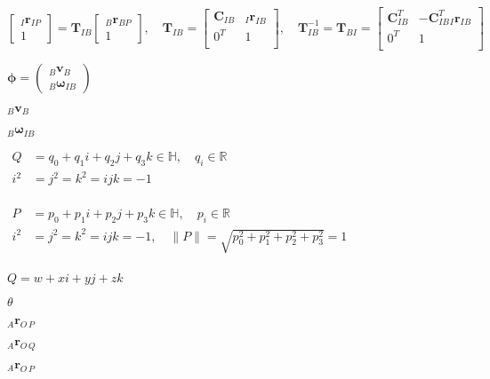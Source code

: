 \documentclass{article}
\begin{document}
$\boxed{\begin{bmatrix}{}_I\mathbf{r}_{I\!P} \\ 1 \end{bmatrix} = \mathbf{T}_{I\!B} \begin{bmatrix}{}_B\mathbf{r}_{B\!P}\\ 1 \end{bmatrix}, \quad \mathbf{T}_{I\!B} = \begin{bmatrix} \mathbf{C}_{I\!B} & {}_I\mathbf{r}_{I\!B} \\ 0^T & 1 \\ \end{bmatrix}, \quad \mathbf{T}_{I\!B}^{-1} =\mathbf{T}_{B\!I} = \begin{bmatrix} \mathbf{C}_{I\!B}^T & -\mathbf{C}_{I\!B}^T {}_I\mathbf{r}_{I\!B} \\ 0^T & 1 \\ \end{bmatrix}}$
\pagebreak

$\boxed{\mathbf{\phi} = \begin{pmatrix} {}_B\mathbf{v}_B \\ {}_B\mathbf{\omega}_{I\!B}\end{pmatrix}}$
\pagebreak

${}_B\mathbf{v}_B$
\pagebreak

${}_B\mathbf{\omega}_{I\!B}$
\pagebreak

$\boxed{\begin{aligned}Q &= q_0 + q_1 i + q_2 j + q_3 k \in \mathbb{H}, \quad q_i \in \mathbb{R} \\ i^2 &= j^2=k^2 = ijk = -1 \\ \end{aligned}}$
\pagebreak

$\boxed{\begin{aligned}P &= p_0 + p_1 i + p_2 j + p_3 k \in \mathbb{H}, \quad p_i \in \mathbb{R} \\ i^2 &= j^2=k^2 = ijk = -1, \quad \lVert P \rVert= \sqrt{p_0^2 + p_1^2 + p_2^2 + p_3^2} = 1 \\ \end{aligned}}$
\pagebreak

$\boxed{Q = w + x i + yj + z k}$
\pagebreak

$\theta$
\pagebreak

${}_A \mathbf{r}_{O\,P}$
\pagebreak

${}_A \mathbf{r}_{O\,Q}$
\pagebreak

$ {}_A \mathbf{ r}_{O\,P}$
\pagebreak
\end{document}
